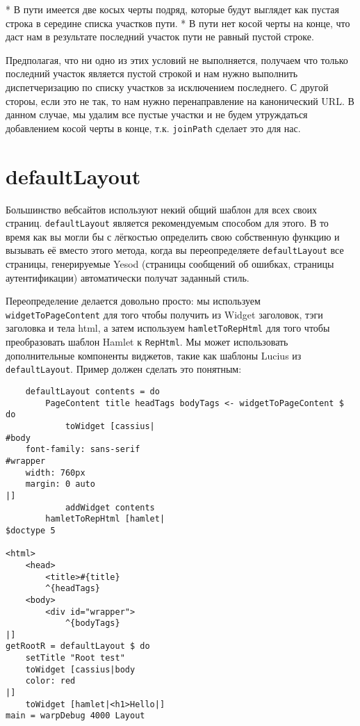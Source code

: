 * В пути имеется две косых черты подряд, которые будут выглядет как пустая строка в середине списка участков пути.
* В пути нет косой черты на конце, что даст нам в результате последний участок пути не равный пустой строке.

Предполагая, что ни одно из этих условий не выполняется, получаем что только последний участок является пустой строкой и нам нужно выполнить диспетчеризацию по списку участков за исключением последнего. С другой стороы, если это не так, то нам нужно перенаправление на канонический URL. В данном случае, мы удалим все пустые участки и не будем утруждаться добавлением косой черты в конце, т.к. \lstinline'joinPath' сделает это для нас.

\section {defaultLayout}

Большинство вебсайтов используют некий общий шаблон для всех своих страниц. \lstinline'defaultLayout' является рекомендуемым способом для этого. В то время как вы могли бы с лёгкостью определить свою собственную функцию и вызывать её вместо этого метода, когда вы переопределяете \lstinline'defaultLayout' все страницы, генерируемые Yesod (страницы сообщений об ошибках, страницы аутентификации) автоматически получат заданный стиль.

Переопределение делается довольно просто: мы используем \lstinline{widgetToPageContent} для того чтобы получить из Widget заголовок, тэги заголовка и тела html, а затем используем \lstinline{hamletToRepHtml} для того чтобы преобразовать шаблон Hamlet к \lstinline{RepHtml}. Мы может использовать дополнительные компоненты виджетов, такие как шаблоны Lucius из \lstinline{defaultLayout}. Пример должен сделать это понятным:

\begin{lstlisting}
    defaultLayout contents = do
        PageContent title headTags bodyTags <- widgetToPageContent $ do
            toWidget [cassius|
#body
    font-family: sans-serif
#wrapper
    width: 760px
    margin: 0 auto
|]
            addWidget contents
        hamletToRepHtml [hamlet|
$doctype 5

<html>
    <head>
        <title>#{title}
        ^{headTags}
    <body>
        <div id="wrapper">
            ^{bodyTags}
|]
getRootR = defaultLayout $ do
    setTitle "Root test"
    toWidget [cassius|body
    color: red
|]
    toWidget [hamlet|<h1>Hello|]
main = warpDebug 4000 Layout
\end{lstlisting}%


